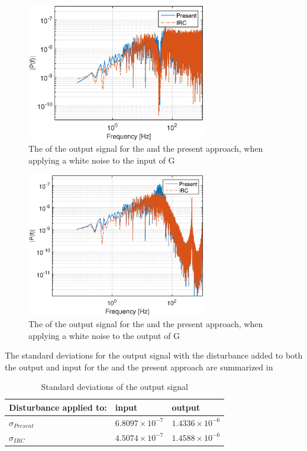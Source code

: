 \begin{figure}[h!]
  \centering
  \includegraphics[width=0.7\textwidth]{fig/matlab/whitenoiseoutput.eps}
  \caption{\label{fig:fft_in} The \abbrFFT of the output signal for the \abbrIRC and the present approach, when applying a white noise to the input of G}
\end{figure}

\begin{figure}[h!]
  \centering
  \includegraphics[width=0.7\textwidth]{fig/matlab/whitenoiseinput.eps}
  \caption{\label{fig:fft_out} The \abbrFFT of the output signal for the \abbrIRC and the present approach, when applying a white noise to the output of G}
\end{figure}


The standard deviations for the output signal with the disturbance added to both the output and input for the \abbrIRC and the present approach are summarized in

\begin{table}[h!]
  \centering
  \begin{tabular}{| l | l | l |}
    \hline
    Disturbance applied to: & input & output \\ \hline
      $\sigma_{Present}$ & $6.8097 \times 10^{-7}$ & $1.4336 \times 10^{-6}$ \\
      $\sigma_{IRC}$ & $4.5074 \times 10^{-7}$  & $ 1.4588 \times 10^{-6}$ \\
    \hline
  \end{tabular}
  \caption{\label{tab:std} Standard deviations of the output signal}
\end{table}

